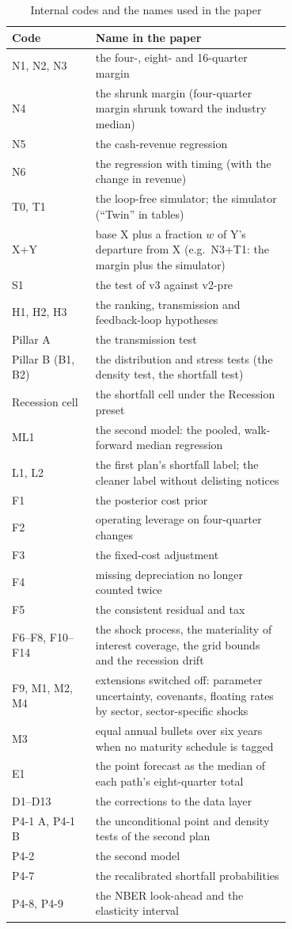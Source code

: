 \begin{table}[!htbp]
\centering\scriptsize
\caption{Internal codes and the names used in the paper}
\label{tab:codes}
\begin{tabular}{lp{0.7\linewidth}}
\toprule
Code & Name in the paper \\
\midrule
N1, N2, N3 & the four-, eight- and 16-quarter margin \\
N4 & the shrunk margin (four-quarter margin shrunk toward the industry median) \\
N5 & the cash-revenue regression \\
N6 & the regression with timing (with the change in revenue) \\
T0, T1 & the loop-free simulator; the simulator (``Twin'' in tables) \\
X+Y & base X plus a fraction $w$ of Y's departure from X (e.g.\ N3+T1: the margin plus the simulator) \\
S1 & the test of v3 against v2-pre \\
H1, H2, H3 & the ranking, transmission and feedback-loop hypotheses \\
Pillar A & the transmission test \\
Pillar B (B1, B2) & the distribution and stress tests (the density test, the shortfall test) \\
Recession cell & the shortfall cell under the Recession preset \\
ML1 & the second model: the pooled, walk-forward median regression \\
L1, L2 & the first plan's shortfall label; the cleaner label without delisting notices \\
F1 & the posterior cost prior \\
F2 & operating leverage on four-quarter changes \\
F3 & the fixed-cost adjustment \\
F4 & missing depreciation no longer counted twice \\
F5 & the consistent residual and tax \\
F6--F8, F10--F14 & the shock process, the materiality of interest coverage, the grid bounds and the recession drift \\
F9, M1, M2, M4 & extensions switched off: parameter uncertainty, covenants, floating rates by sector, sector-specific shocks \\
M3 & equal annual bullets over six years when no maturity schedule is tagged \\
E1 & the point forecast as the median of each path's eight-quarter total \\
D1--D13 & the corrections to the data layer \\
P4-1 A, P4-1 B & the unconditional point and density tests of the second plan \\
P4-2 & the second model \\
P4-7 & the recalibrated shortfall probabilities \\
P4-8, P4-9 & the NBER look-ahead and the elasticity interval \\
\bottomrule
\end{tabular}
\end{table}
